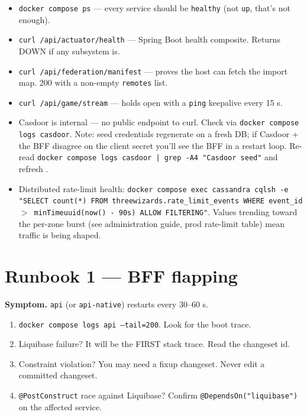 \documentclass[11pt,a4paper,openany]{book}
\begin{document}
\begin{itemize}
  \item \texttt{docker compose ps} --- every service should be
        \texttt{healthy} (not \texttt{up}, that's not enough).
  \item \texttt{curl /api/actuator/health} --- Spring Boot health
        composite. Returns DOWN if any subsystem is.
  \item \texttt{curl /api/federation/manifest} --- proves the host
        can fetch the import map. 200 with a non-empty
        \texttt{remotes} list.
  \item \texttt{curl /api/game/stream} --- holds open with a
        \texttt{ping} keepalive every 15 s.
  \item Casdoor is internal --- no public endpoint to curl. Check via
        \texttt{docker compose logs casdoor}. Note: seed credentials
        regenerate on a fresh DB; if Casdoor + the BFF disagree on the
        client secret you'll see the BFF in a restart loop. Re-read
        \texttt{docker compose logs casdoor | grep -A4 "Casdoor seed"}
        and refresh .
  \item Distributed rate-limit health:
        \texttt{docker compose exec cassandra cqlsh -e "SELECT count(*)
        FROM threewizards.rate\_limit\_events WHERE event\_id $>$
        minTimeuuid(now() - 90s) ALLOW FILTERING"}. Values trending
        toward the per-zone burst (see administration guide, prod
        rate-limit table) mean traffic is being shaped.
\end{itemize}

\chapter{Runbook 1 --- BFF flapping}
\textbf{Symptom.} \texttt{api} (or \texttt{api-native}) restarts every
30--60 s.

\begin{enumerate}
  \item \texttt{docker compose logs api --tail=200}. Look for the boot
        trace.
  \item Liquibase failure? It will be the FIRST stack trace. Read the
        changeset id.
  \item Constraint violation? You may need a fixup changeset. Never
        edit a committed changeset.
  \item \texttt{@PostConstruct} race against Liquibase? Confirm
        \texttt{@DependsOn("liquibase")} on the affected service.
\end{enumerate}
\end{document}
